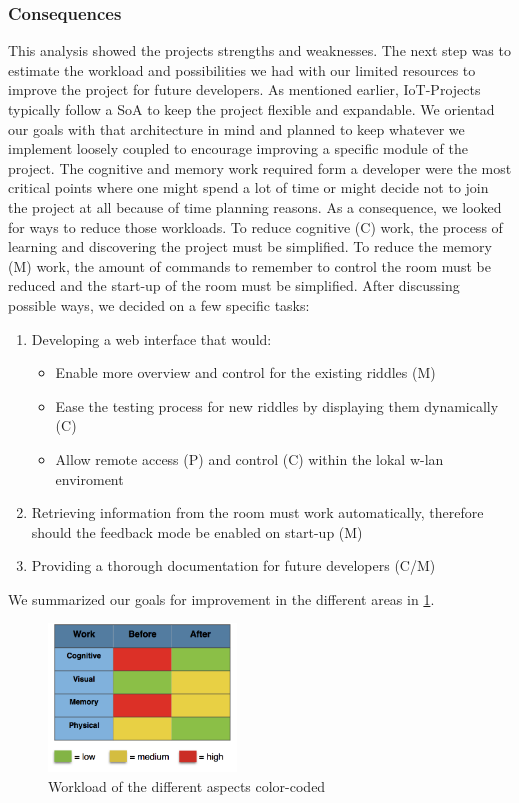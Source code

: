 \subsubsection{Consequences}
This analysis showed the projects strengths and weaknesses. The next step was to estimate the workload and possibilities 
we had with our limited resources to improve the project for future developers. 
As mentioned earlier, IoT-Projects typically follow a SoA %
to keep the project flexible and expandable. 
We orientad our goals with that architecture in mind and planned to keep whatever 
we implement loosely coupled to encourage improving a specific module of the project.
The cognitive and memory work required form a developer were the most critical points 
where one might spend a lot of time or might decide not to join the project at all because of time planning reasons.
As a consequence, we looked for ways to reduce those workloads.
To reduce cognitive (C) work, the process of learning and discovering the project must be simplified.
To reduce the memory (M) work, the amount of commands to remember to control the room must be reduced and the start-up of the room must be simplified.
After discussing possible ways, we decided on a few specific tasks:
\begin{enumerate}
    \item Developing a web interface that would:
    \begin{itemize}
        \item Enable more overview and control for the existing riddles (M)
        \item Ease the testing process for new riddles by displaying them dynamically (C)
        \item Allow remote access (P) and control (C) within the lokal w-lan enviroment 
    \end{itemize}
    \item Retrieving information from the room must work automatically, therefore should the feedback mode be enabled on start-up (M)
    \item Providing a thorough documentation for future developers  (C/M) 
\end{enumerate}

We summarized our goals for improvement in the different areas in \ref{fig:workload}.


\begin{figure}[th]
    \centering
    \includegraphics[width=50mm,scale=.5]{Figures/workload}
    \decoRule
    \caption[workload]{Workload of the different aspects color-coded}
    \label{fig:workload}
\end{figure}
